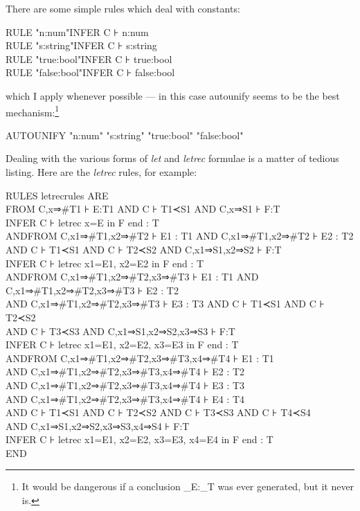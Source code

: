 There are some simple rules which deal with constants:
\begin{japeish}
RULE "n:num"\tab INFER C ⊦ n:num\\
RULE "s:string"\tab INFER C ⊦ s:string\\
RULE "true:bool"\tab INFER C ⊦ true:bool\\
RULE "false:bool"\tab INFER C ⊦ false:bool
\end{japeish}
which I apply whenever possible --- in this case autounify seems to be the best mechanism:\footnote{It would be dangerous if a conclusion \_E:\_T was ever generated, but it never is.}
\begin{japeish}
AUTOUNIFY "n:num" "s:string" "true:bool" "false:bool"
\end{japeish}

Dealing with the various forms of \textit{let} and \textit{letrec} formulae is a matter of tedious listing. Here are the \textit{letrec} rules, for example:
\begin{japeish}
RULES letrecrules ARE\\
\tab FROM C,x⇒\#T1 ⊦ E:T1 AND C ⊦ T1≺S1 AND C,x⇒S1 ⊦ F:T\\
\tab \tab INFER C ⊦ letrec x=E in F end : T\\
AND\tab FROM C,x1⇒\#T1,x2⇒\#T2 ⊦ E1 : T1 AND C,x1⇒\#T1,x2⇒\#T2 ⊦ E2 : T2 \\
\tab AND C ⊦ T1≺S1 AND C ⊦ T2≺S2 AND C,x1⇒S1,x2⇒S2 ⊦ F:T\tab \\
\tab \tab INFER C ⊦ letrec x1=E1, x2=E2 in F end : T\\
AND\tab FROM C,x1⇒\#T1,x2⇒\#T2,x3⇒\#T3 ⊦ E1 : T1 AND C,x1⇒\#T1,x2⇒\#T2,x3⇒\#T3 ⊦ E2 : T2\\
\tab AND C,x1⇒\#T1,x2⇒\#T2,x3⇒\#T3 ⊦ E3 : T3 AND C ⊦ T1≺S1 AND C ⊦ T2≺S2\\
\tab AND C ⊦ T3≺S3 AND C,x1⇒S1,x2⇒S2,x3⇒S3 ⊦ F:T\\
\tab \tab INFER C ⊦ letrec x1=E1, x2=E2, x3=E3 in F end : T\\
AND\tab FROM C,x1⇒\#T1,x2⇒\#T2,x3⇒\#T3,x4⇒\#T4 ⊦ E1 : T1 \\
\tab AND C,x1⇒\#T1,x2⇒\#T2,x3⇒\#T3,x4⇒\#T4 ⊦ E2 : T2\\
\tab AND C,x1⇒\#T1,x2⇒\#T2,x3⇒\#T3,x4⇒\#T4 ⊦ E3 : T3 \\
\tab AND C,x1⇒\#T1,x2⇒\#T2,x3⇒\#T3,x4⇒\#T4 ⊦ E4 : T4\\
\tab AND C ⊦ T1≺S1 AND C ⊦ T2≺S2 AND C ⊦ T3≺S3 AND C ⊦ T4≺S4\\
\tab AND C,x1⇒S1,x2⇒S2,x3⇒S3,x4⇒S4 ⊦ F:T\\
\tab \tab INFER C ⊦ letrec x1=E1, x2=E2, x3=E3, x4=E4 in F end : T\\
END
\end{japeish}

